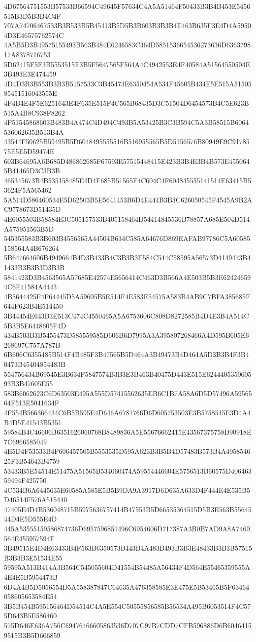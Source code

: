 {{{{{{{{{{{{{{{{{{{{{4D67564751553B57533B66594C49645F57634C4A5A51464F50433B3B4B453E5456515B3D5B3B4C4F
707A74706467533B3B533B5B45413B5D5B3B603B3B3B4E463B635F3E4D4A59504D3E46575762574C
4A5B5D3B49575155493B563B484E6246583C464D5851536654536273636D636379817A8378716753
5D62415F5F3B5553515E3B5F5647565F564A4C4942553E4F40584A51564550504E3B493E3E474459
4D4D3B3B553B3B3B5157533C3B45473E6350454A534F45605B434E5E515A5150585451516043555E
4F4B4E4F5E6251643E4F635E515F4C565B68435D3C51504D6454573B4C5E623B515A4B8C938F8262
4F51545868603B483B4A474C4D494C493B5A53425B3C3B594C5A3B58515B6064536062635B513B4A
43544F50625B59495B5D6048495555516B516955565B5D5156576B80949E9C9178575E5E5D59474E
603B64695A6B685D486862685F67593E57515448415E423B3B4E3B4B573E4550645B41465D3C3B3B
465345673B4B535158485E4D4F685B51565F4C604C4F604845555141514E63415B53624F5A565462
5A514D586460534E5D62503B5E5641453B6D4E444B3B3C626050545F4545A9B2AC9778673D51435D
4E6055503B58584E3C505157533B405158464D54414845536B78857A685E504D514A575951563B5D
545355583B3B603B4556565A44504B634C585A64676D869EAFAB97786C5A60585158564A4B676264
5B647664606B4949664B4D3B433B4C3B3B3E584C544C58595A56573D4149473B41433B3B3B3D3B3B
5841423D3B4563565A57685E42574E5656414C463D3B566A4E503B5B3E624246594C6E41584A4443
4B5644425F4F64445D5A59605B5E514F4E583E54575A583B4AB9C7BFA385685F644F623B4E514450
3B44454E643B3E513C474C4550465A5A6753606C808D8272585B4D4E3B4A514C5B3B5E6448605F4D
434B503B3B5455473D585559585D606B6D7995A3A395807268466A4D595B605E6268697C757A787B
6B606C6355485B514F4B485F3B47565B5D464A3B49473B4D464A5D3B3B4F3B40473B45404854483B
554756434B69545E3B634F5847574B3B3E3B463B40475D443E515E624440535060593B3B47605E55
583B6062623C6D63503E495A555D57415562635EB6C1B7A58A6D5D57496A5956564F513E5041634F
4F554B566366434C6B5B595E4D646A6781766D6D605753503E3B5758545E3D4A4B4D5E41543B5351
59584B4C46606B6351626060768B8489836A5E55676662415E43567375758D90918E7C6966585049
4E5D4F53533B4F606457505B5553535D595A623B3B5B4D57483B573B4A495854625F3B54643B4759
53433B5E54514E51475A51565B534060474A59554446604E5756513B60575D40646359494F425750
4C534B6A6445635E60585A585E5B5B9DA9A3917D6D635A633D4F444E4E535B5D46514F576A515440
47405E4D4B536048715B5975636757414B47553B5D66535364515D5B3E563B5564544D4E5D555E4D
445A53555159586874736D6957596851496C6954606D717387A3B0B7AD9A8A7460564E455957594F
3B49515E4D4E63433B4F563B6350573B443B4A483B493B3B3E48433B3B3B57515B3B3B3E51534E55
59595A513B414A3B564C545055604D41554B54485A56434F4D564E55465359555A4E4E5B5954473B
6D4A4B5D5056554D5A558387847C64635A476358585E3E475E5B53465B5F63464058605653584E54
3B5B454B595156464D54514C4A5E554C50555856585B56534A495B6053514F4C575D643B5E586460
575D646E636A756C69476466605863536D707C97B7CDD7CFB596886D6B60464159515B3B5D606859
}}}}}}}}}}}}}}}}}}}}}
